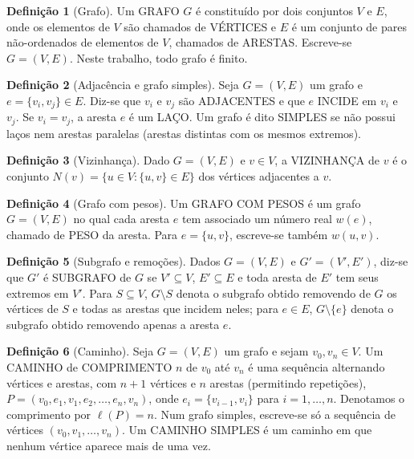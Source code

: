 \documentclass{article}
\theoremstyle{definition}
\newtheorem{definicao}{Definição}[section]
\theoremstyle{plain}
\begin{document}
\begin{definicao}[Grafo]\label{def:grafo}
Um GRAFO $G$ é constituído por dois conjuntos $V$ e $E$, onde os elementos de $V$
são chamados de VÉRTICES e $E$ é um conjunto de pares não-ordenados de elementos
de $V$, chamados de ARESTAS. Escreve-se $G=(V,E)$. Neste trabalho, todo grafo é
finito.
\end{definicao}

\begin{definicao}[Adjacência e grafo simples]\label{def:simples}
Seja $G=(V,E)$ um grafo e $e = \{v_i, v_j\} \in E$. Diz-se que $v_i$ e $v_j$ são
ADJACENTES e que $e$ INCIDE em $v_i$ e $v_j$. Se $v_i = v_j$, a aresta $e$ é um
LAÇO. Um grafo é dito SIMPLES se não possui laços nem arestas paralelas (arestas
distintas com os mesmos extremos).
\end{definicao}

\begin{definicao}[Vizinhança]\label{def:vizinhanca}
Dado $G=(V,E)$ e $v \in V$, a VIZINHANÇA de $v$ é o conjunto
$N(v) = \{u \in V : \{u,v\} \in E\}$ dos vértices adjacentes a $v$.
\end{definicao}

\begin{definicao}[Grafo com pesos]\label{def:pesos}
Um GRAFO COM PESOS é um grafo $G=(V,E)$ no qual cada aresta $e$ tem associado um
número real $w(e)$, chamado de PESO da aresta. Para $e = \{u,v\}$, escreve-se
também $w(u,v)$.
\end{definicao}

\begin{definicao}[Subgrafo e remoções]\label{def:subgrafo}
Dados $G=(V,E)$ e $G'=(V',E')$, diz-se que $G'$ é SUBGRAFO de $G$ se
$V' \subseteq V$, $E' \subseteq E$ e toda aresta de $E'$ tem seus extremos em
$V'$. Para $S \subseteq V$, $G \setminus S$ denota o subgrafo obtido removendo de
$G$ os vértices de $S$ e todas as arestas que incidem neles; para $e \in E$,
$G \setminus \{e\}$ denota o subgrafo obtido removendo apenas a aresta $e$.
\end{definicao}

\begin{definicao}[Caminho]\label{def:caminho}
Seja $G=(V,E)$ um grafo e sejam $v_0, v_n \in V$. Um CAMINHO de COMPRIMENTO $n$
de $v_0$ até $v_n$ é uma sequência alternando vértices e arestas, com $n+1$
vértices e $n$ arestas (permitindo repetições),
$P = (v_0, e_1, v_1, e_2, \dots, e_n, v_n)$, onde $e_i = \{v_{i-1}, v_i\}$ para
$i = 1, \dots, n$. Denotamos o comprimento por $\ell(P) = n$. Num grafo simples,
escreve-se só a sequência de vértices $(v_0, v_1, \dots, v_n)$. Um CAMINHO
SIMPLES é um caminho em que nenhum vértice aparece mais de uma vez.
\end{definicao}
\end{document}
